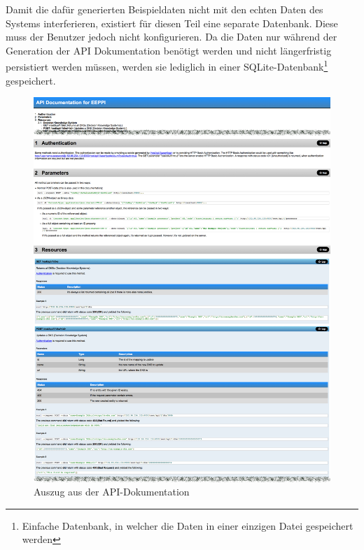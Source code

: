 		Damit die dafür generierten Beispieldaten nicht mit den echten Daten des Systems interferieren,
		existiert für diesen Teil eine separate Datenbank.
		Diese muss der Benutzer jedoch nicht konfigurieren.
		Da die Daten nur während der Generation der API Dokumentation benötigt werden
		und nicht längerfristig persistiert werden müssen,
		werden sie lediglich in einer SQLite-Datenbank\footnote{Einfache Datenbank, in welcher die Daten in einer einzigen Datei gespeichert werden} gespeichert.
	
	\begin{figure}[H]
		\includegraphics[width=\textwidth]{codeDocumentation/media/img/apiDocumentation.png}
		\centering
		\caption{Auszug aus der API-Dokumentation}
		\label{fig:apiScreenshot}
	\end{figure}
